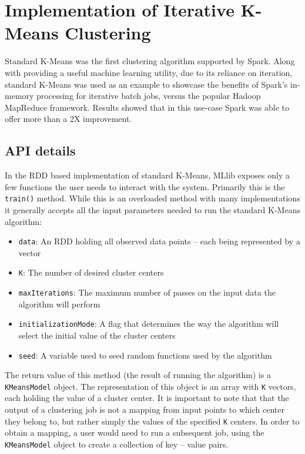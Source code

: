 \documentclass{l4proj}
\begin{document}
\section{Implementation of Iterative K-Means Clustering}

Standard K-Means was the first clustering algorithm supported by Spark. Along with providing a useful machine learning utility, due to its reliance on iteration, standard K-Means was used as an example to showcase the benefits of Spark's in-memory processing for iterative batch jobs, versus the popular Hadoop MapReduce framework. Results showed that in this use-case Spark was able to offer more than a 2X improvement\cite{Comparison}.

\subsection{API details}

In the RDD based implementation of standard K-Means, MLlib exposes only a few functions the user needs to interact with the system. Primarily this is the \texttt{train()} method. While this is an overloaded method with many implementations it generally accepts all the input parameters needed to run the standard K-Means algorithm:

\begin{itemize}
\item \texttt{data}: An RDD holding all observed data points -- each being represented by a vector
\item \texttt{K}: The number of desired cluster centers
\item \texttt{maxIterations}: The maximum number of passes on the input data the algorithm will perform
\item \texttt{initializationMode}: A flag that determines the way the algorithm will select the initial value of the cluster centers
\item \texttt{seed}: A variable used to seed random functions used by the algorithm
\end{itemize}

The return value of this method (the result of running the algorithm) is a \texttt{KMeansModel} object. The representation of this object is an array with \texttt{K} vectors, each holding the value of a cluster center. It is important to note that that the output of a clustering job is not a mapping from input points to which center they belong to, but rather simply the values of the specified \texttt{K} centers. In order to obtain a mapping, a user would need to run a subsequent job, using the \texttt{KMeansModel} object to create a collection of key -- value pairs.
\end{document}
